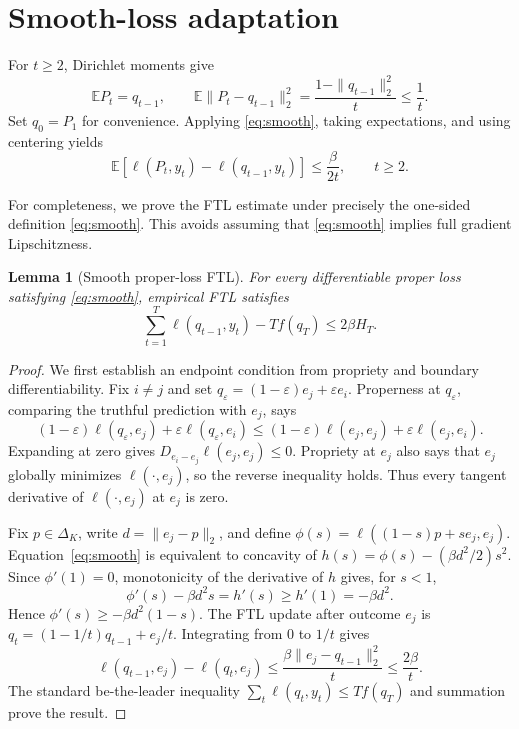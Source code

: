 \documentclass{article}
\newtheorem{lemma}[theorem]{Lemma}
\theoremstyle{definition}
\theoremstyle{remark}
\newcommand{\E}{\mathbb E}
\newcommand{\DeltaK}{\Delta_K}
\begin{document}
\section{Smooth-loss adaptation}\label{sec:smooth}

For $t\geq2$, Dirichlet moments give
\begin{equation}
 \E P_t=q_{t-1},\qquad
 \E\|P_t-q_{t-1}\|_2^2
 =\frac{1-\|q_{t-1}\|_2^2}{t}\leq\frac1t.     \tag{8}\label{eq:moments}
\end{equation}
Set $q_0=P_1$ for convenience.  Applying \eqref{eq:smooth}, taking expectations, and using centering yields
\begin{equation}
 \E[\ell(P_t,y_t)-\ell(q_{t-1},y_t)]
 \leq\frac{\beta}{2t},\qquad t\geq2.           \tag{9}\label{eq:perturb-smooth}
\end{equation}

For completeness, we prove the FTL estimate under precisely the one-sided definition \eqref{eq:smooth}.  This avoids assuming that \eqref{eq:smooth} implies full gradient Lipschitzness.

\begin{lemma}[Smooth proper-loss FTL]\label{lem:smooth-ftl}
For every differentiable proper loss satisfying \eqref{eq:smooth}, empirical FTL satisfies \[ \sum_{t=1}^T\ell(q_{t-1},y_t)-Tf(q_T)\leq2\beta H_T. \]
\end{lemma}

\begin{proof}
We first establish an endpoint condition from propriety and boundary differentiability.  Fix $i\neq j$ and set $q_\varepsilon=(1-\varepsilon)e_j+\varepsilon e_i$.  Properness at $q_\varepsilon$, comparing the truthful prediction with $e_j$, says \[ (1-\varepsilon)\ell(q_\varepsilon,e_j) +\varepsilon\ell(q_\varepsilon,e_i) \leq(1-\varepsilon)\ell(e_j,e_j) +\varepsilon\ell(e_j,e_i). \] Expanding at zero gives $D_{e_i-e_j}\ell(e_j,e_j)\leq0$.  Propriety at $e_j$ also says that $e_j$ globally minimizes $\ell(\cdot,e_j)$, so the reverse inequality holds. Thus every tangent derivative of $\ell(\cdot,e_j)$ at $e_j$ is zero.

Fix $p\in\DeltaK$, write $d=\|e_j-p\|_2$, and define $\phi(s)=\ell((1-s)p+se_j,e_j)$.  Equation~\eqref{eq:smooth} is equivalent to concavity of $h(s)=\phi(s)-(\beta d^2/2)s^2$.  Since $\phi'(1)=0$, monotonicity of the derivative of $h$ gives, for $s<1$, \[ \phi'(s)-\beta d^2s=h'(s)\geq h'(1)=-\beta d^2. \] Hence $\phi'(s)\geq-\beta d^2(1-s)$.  The FTL update after outcome $e_j$ is $q_t=(1-1/t)q_{t-1}+e_j/t$.  Integrating from $0$ to $1/t$ gives \[ \ell(q_{t-1},e_j)-\ell(q_t,e_j) \leq\frac{\beta\|e_j-q_{t-1}\|_2^2}{t} \leq\frac{2\beta}{t}. \] The standard be-the-leader inequality $\sum_t\ell(q_t,y_t)\leq Tf(q_T)$ and summation prove the result.
\end{proof}
\end{document}

